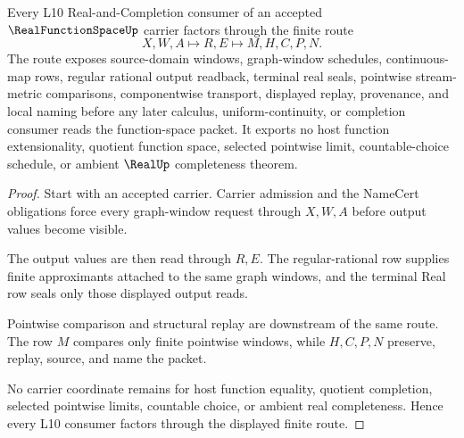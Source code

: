 \begin{theorem}\label{thm:real-function-space-finite-graph-window-handoff}
Every L10 Real-and-Completion consumer of an accepted $\RealFunctionSpaceUp$ carrier factors through the finite route
$$
X,W,A \longmapsto R,E \longmapsto M,H,C,P,N .
$$
The route exposes source-domain windows, graph-window schedules, continuous-map rows, regular rational output readback, terminal real seals, pointwise stream-metric comparisons, componentwise transport, displayed replay, provenance, and local naming before any later calculus, uniform-continuity, or completion consumer reads the function-space packet. It exports no host function extensionality, quotient function space, selected pointwise limit, countable-choice schedule, or ambient $\RealUp$ completeness theorem.
\end{theorem}
\begin{proof}
Start with an accepted carrier. Carrier admission and the NameCert obligations force every graph-window request through $X,W,A$ before output values become visible.

The output values are then read through $R,E$. The regular-rational row supplies finite approximants attached to the same graph windows, and the terminal Real row seals only those displayed output reads.

Pointwise comparison and structural replay are downstream of the same route. The row $M$ compares only finite pointwise windows, while $H,C,P,N$ preserve, replay, source, and name the packet.

No carrier coordinate remains for host function equality, quotient completion, selected pointwise limits, countable choice, or ambient real completeness. Hence every L10 consumer factors through the displayed finite route.
\end{proof}



